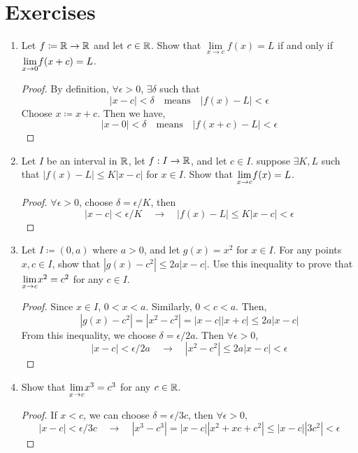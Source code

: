 \section{Exercises}
\begin{enumerate}
    \item Let $f \coloneqq {\mathbb{R}} \rightarrow {\mathbb{R}}$ and let $c \in {\mathbb{R}}$. Show that $\underset{x \to c}{\lim} f(x) = L$ if and only if $\underset{x \to 0}{\lim}f(x+c) = L$.
          \begin{proof}
              By definition, $\forall \epsilon > 0$, $\exists \delta$ such that
              \[|x-c| < \delta \quad \text{means} \quad |f(x) -L| < \epsilon\]
              Choose $x \coloneqq x+c$. Then we have,
              \[ |x-0| < \delta \quad \text{means} \quad |f(x+c) - L| < \epsilon\]
          \end{proof}
    \item Let $I$ be an interval in ${\mathbb{R}}$, let $f : I \to {\mathbb{R}}$, and let $c \in I$. suppose $\exists K,L$ such that $|f(x) - L| \le K|x-c|$ for $x \in I$. Show that $\underset{x \to c}{\lim}f(x) = L$.
          \begin{proof}
              $\forall \epsilon >0$, choose $\delta = \epsilon/K$, then
              \[ |x - c| < \epsilon/K \quad \rightarrow \quad |f(x)-L| \le K|x-c| < \epsilon\]
          \end{proof}
    \item Let $I \coloneqq (0,a)$ where $a > 0$, and let $g(x) = x^2$ for $x \in I$. For any points $x,c \in I$, show that $|g(x)-c^2| \le 2a|x-c|$. Use this inequality to prove that $\underset{x \to c}{\lim}x^2 = c^2$ for any $c \in I$.
          \begin{proof}
              Since $x \in I$, $0 < x < a$. Similarly, $ 0 < c < a$. Then,
              \[ |g(x) -c^2| = |x^2-c^2| = |x-c||x+c| \le 2a|x-c|\]
              From this inequality, we choose $\delta = \epsilon/2a$. Then $\forall \epsilon > 0$,
              \[ |x-c| < \epsilon/2a \quad \rightarrow \quad |x^2-c^2|\le 2a|x-c| < \epsilon\]
          \end{proof}
    \item Show that $\underset{x \to c}{\lim}x^3 = c^3$ for any $c \in {\mathbb{R}}$.
          \begin{proof}
              If $x < c$, we can choose $\delta = \epsilon/ 3c$, then $\forall \epsilon > 0$,
              \[ |x-c| < \epsilon/ 3c \quad \rightarrow \quad |x^3-c^3| = |x-c||x^2+xc+c^2| \le |x-c||3c^2| < \epsilon\]
          \end{proof}
\end{enumerate}

